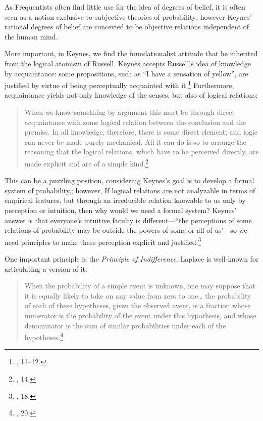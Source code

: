 As Frequentists often find little use for the idea of degrees of belief,
it is often seen as a notion exclusive to subjective theories of
probability; however Keynes' rational degrees of belief are concevied to
be objective relations independent of the human mind.

More important, in Keynes, we find the foundationalist attitude that he
inherited from the logical atomism of Russell. Keynes accepts Russell's
idea of knowledge by acquaintance: some propositions, such as ``I have a
sensation of yellow'', are justified by virtue of being perceptually
acquainted with it.\footnote{\cite{keynes}, 11--12.} Furthermore, acquaintance
yields not only knowledge of the senses, but also of logical relations:

\begin{quote}
When we know something by argument this must be through direct
acquaintance with some logical relation between the conclusion and the
premiss. In all knowledge, therefore, there is some direct element; and
logic can never be made purely mechanical. All it can do is so to
arrange the reasoning that the logical relations, which have to be
perceived directly, are made explicit and are of a simple
kind.\footnote{\cite{keynes}, 14.}
\end{quote}

This can be a puzzling position, considering Keynes's goal is to develop a
formal system of probability,; however, If logical relations are not
analyzable in terms of empirical features, but through an irreducible relation
knowable to us only by perception or intuition, then why would we need a
formal system? Keynes' answer is that everyone's intuitive faculty is
different---``the perceptions of some relations of probability may be
outside the powers of some or all of us'---so we need principles to make
these perception explicit and justified.\footnote{\cite{keynes}, 18.}

One important principle is the \emph{Principle of Indifference}. Laplace
is well-known for articulating a version of it:

\begin{quote}
When the probability of a simple event is unknown, one may suppose that
it is equally likely to take on any value from zero to one\ldots{} the
probability of each of these hypotheses, given the observed event, is a
fraction whose numerator is the probability of the event under this hypothesis, and whose denominator is the sum of similar probabilities under each of the hypotheses.\footnote{\cite{laplace}, 20.}
\end{quote}

